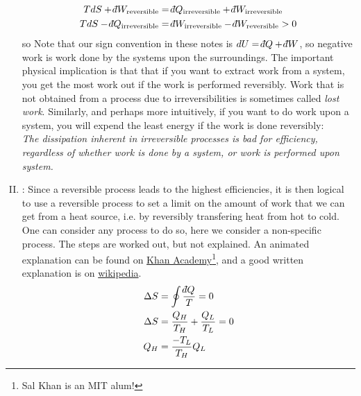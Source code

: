 \documentclass[12pt]{article}
\def\dbar{{\mathchar'26\mkern-12mu d}}
\begin{document}
\begin{enumerate}[(I)]
\begin{align} T dS + \dbar W_\text{reversible} &= \dbar Q_\text{irreversible} + \dbar W_\text{irreversible}\\
T dS -\dbar Q_\text{irreversible}  &= \dbar W_\text{irreversible} - \dbar W_\text{reversible} > 0
\end{align}
so
\beq \boxed{\dbar W_\text{reversible} < \dbar W_\text{irreversible}}
\ceq
Note that our sign convention in these notes is $dU = \dbar Q + \dbar W$, so negative work is work done by the systems upon the surroundings. The important physical implication is that that if you want to extract work from a system, you get the most work out if the work is performed reversibly. Work that is not obtained from a process due to irreversibilities is sometimes called \emph{lost work}. Similarly, and perhaps more intuitively, if you want to do work upon a system, you will expend the least energy if the work is done reversibly: \\ \emph{The dissipation inherent in irreversible processes is bad for efficiency, regardless of whether work is done by a system, or work is performed upon system.} %
\item {}: 
Since a reversible process leads to the highest efficiencies, it is then logical to use a reversible process to set a limit on the amount of work that we can get from a heat source, i.e. by reversibly transfering heat from hot to cold. One can consider any process to do so, here we consider a non-specific process. The steps are worked out, but not explained. An animated explanation can be found on \href{https://www.khanacademy.org/science/physics/thermodynamics/v/efficiency-of-a-carnot-engine}{Khan Academy}\footnote{Sal Khan is an MIT alum!}, and a good written explanation is on \href{https://en.wikipedia.org/wiki/Carnot_cycle}{wikipedia}.
\begin{align*}
\Delta S &= \oint \frac{\dbar Q}{T} = 0\\
\Delta S &= \frac{Q_H}{T_H} + \frac{Q_L}{T_L} = 0\\
Q_H &= \frac{-T_L}{T_H} Q_L

\end{align*}
\end{enumerate}
\end{document}
